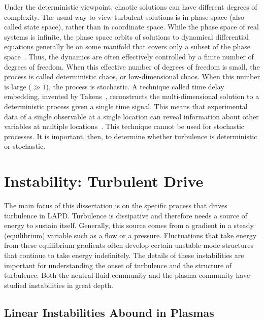 Under the deterministic viewpoint, chaotic solutions can have different degrees of complexity. The usual way to view turbulent solutions is in phase space (also called state space),
rather than in coordinate space. While the phase space of real systems is infinite, the phase space orbits of solutions to dynamical differential equations generally lie on some manifold
that covers only a subset of the phase space~\cite{manneville2004}. Thus, the dynamics are often effectively controlled by a finite number of degrees of freedom. 
When this effective number of degrees of freedom is small, the process is called deterministic chaos, or low-dimensional chaos. When this number is large ($\gg 1$), the process is stochastic. 
A technique called time delay embedding,
invented by Takens~\cite{takens1981}, reconstructs the multi-dimensional solution to a deterministic process given a single time signal. This means that experimental data of a single observable
at a single location can reveal information about other variables at multiple locations~\cite{bandt2002}. This technique cannot be used for stochastic processes. It is important, then,
to determine whether turbulence is deterministic or stochastic.

\section{Instability: Turbulent Drive}
\label{s_nlin_stability}

The main focus of this dissertation is on the specific process that drives turbulence in LAPD. Turbulence is dissipative and therefore needs a source of energy
to sustain itself. Generally, this source comes from a gradient in a steady (equilibrium) variable such as a flow or a pressure. Fluctuations that take energy from these equilibrium
gradients often develop certain unstable mode structures that continue to take energy indefinitely. The details of these instabilities are important for understanding the onset of turbulence
and the structure of turbulence. Both the neutral-fluid community and the plasma community have studied instabilities in great depth.

\subsection{Linear Instabilities Abound in Plasmas}
\label{s_lin_inst_plasmas}

